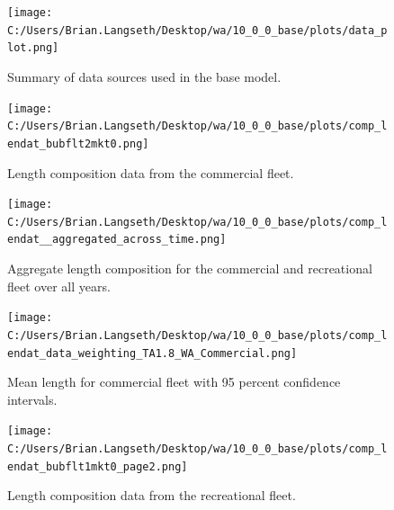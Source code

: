 \documentclass[11pt,
  english,
  letterpaper,
]{article}
\begin{document}
\tagmcend\tagstructend


\begin{figure}
\centering
\texttt{[image: C:/Users/Brian.Langseth/Desktop/wa/10\_0\_0\_base/plots/data\_plot.png]}
\caption{Summary of data sources used in the base model.\label{fig:data-plot}}
\end{figure}

\tagmcend\tagstructend


\begin{figure}
\centering
\texttt{[image: C:/Users/Brian.Langseth/Desktop/wa/10\_0\_0\_base/plots/comp\_lendat\_bubflt2mkt0.png]}
\caption{Length composition data from the commercial fleet.\label{fig:com-len-data}}
\end{figure}

\tagmcend\tagstructend


\begin{figure}
\centering
\texttt{[image: C:/Users/Brian.Langseth/Desktop/wa/10\_0\_0\_base/plots/comp\_lendat\_\_aggregated\_across\_time.png]}
\caption{Aggregate length composition for the commercial and recreational fleet over all years.\label{fig:wa-len-agg}}
\end{figure}

\tagmcend\tagstructend


\begin{figure}
\centering
\texttt{[image: C:/Users/Brian.Langseth/Desktop/wa/10\_0\_0\_base/plots/comp\_lendat\_data\_weighting\_TA1.8\_WA\_Commercial.png]}
\caption{Mean length for commercial fleet with 95 percent confidence intervals.\label{fig:mean-com-len-data}}
\end{figure}

\tagmcend\tagstructend


\begin{figure}
\centering
\texttt{[image: C:/Users/Brian.Langseth/Desktop/wa/10\_0\_0\_base/plots/comp\_lendat\_bubflt1mkt0\_page2.png]}
\caption{Length composition data from the recreational fleet.\label{fig:rec-len-data}}
\end{figure}
\end{document}
